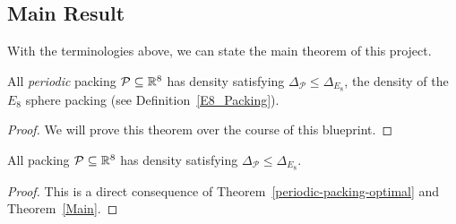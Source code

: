 \subsection{Main Result}

With the terminologies above, we can state the main theorem of this project.

\begin{theorem}\label{Main}
  All \emph{periodic} packing $\mathcal{P} \subseteq \mathbb{R}^8$ has density satisfying $\Delta_{\mathcal{P}} \leq \Delta_{E_8}$, the density of the $E_8$ sphere packing (see Definition~\ref{E8_Packing}).
\end{theorem}
\begin{proof}
  We will prove this theorem over the course of this blueprint.
\end{proof}

\begin{corollary}\label{Main'}
  All packing $\mathcal{P} \subseteq \mathbb{R}^8$ has density satisfying $\Delta_{\mathcal{P}} \leq \Delta_{E_8}$.
\end{corollary}
\begin{proof}
  This is a direct consequence of Theorem~\ref{periodic-packing-optimal} and Theorem~\ref{Main}.
\end{proof}
